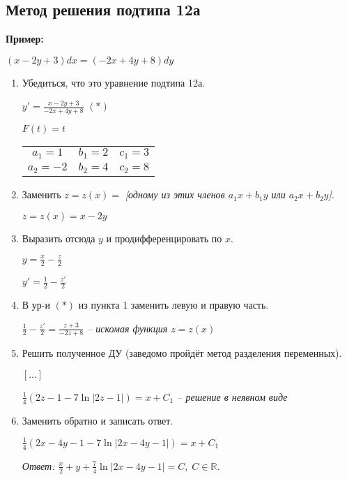 \documentclass[10pt, a4paper]{article}
\begin{document}
\subsection{Метод решения подтипа 12а}
\textbf{Пример:}
\par $(x - 2y + 3)dx = (-2x  + 4y + 8)dy$
\begin{enumerate}
    \item Убедиться, что это уравнение подтипа 12а.
        \par $y' = \frac{x - 2y + 3}{-2x + 4y + 8}$ $(*)$
        \par $F(t) = t$
        \par \begin{tabular}{c c c}
             $a_1 =  1$  & $b_1 = 2$ & $c_1 = 3$  \\
             $a_2 = -2$ & $b_2 = 4$ & $c_2 = 8$
        \end{tabular}
    \item Заменить $z = z(x) =$ \textit{[одному из этих членов $a_1x + b_1y$ или $a_2x + b_2y$]}.
        \par $z = z(x) = x - 2y$
    \item Выразить отсюда $y$ и продифференцировать по $x$.
        \par $y = \frac{x}{2} - \frac{z}{2}$
        \par $y' = \frac{1}{2} - \frac{z'}{2}$
    \item В ур-и $(*)$ из пункта 1 заменить левую и правую часть.
        \par\textit{$\frac{1}{2} - \frac{z'}{2} = \frac{z + 3}{-2z + 8}$ -- искомая функция $z = z(x)$}
    \item Решить полученное ДУ (заведомо пройдёт метод разделения переменных).
        \par $[...]$
        \par\textit{$\frac{1}{4}(2z - 1 - 7\ln{|2z - 1|}) = x + C_1$ -- решение в неявном виде}
    \item Заменить обратно и записать ответ.
        \par $\frac{1}{4}(2x - 4y - 1 - 7\ln{|2x - 4y - 1|}) = x + C_1$
        \par\textit{Ответ: $\frac{x}{2} + y + \frac{7}{4}\ln{|2x - 4y - 1|} = C, \; C \in \mathbb{R}$.}
\end{enumerate}
\end{document}
